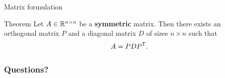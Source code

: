 \documentclass{beamer}
\begin{document}
\begin{frame}[t]{Matrix formulation}
	\grid
	
	\vspace{-0.3cm}
	\begin{block}{Theorem}
	Let $A \in \mathbb{R}^{n \times n}$ be a \textbf{symmetric} matrix. Then there exists an orthogonal matrix $P$ and a diagonal matrix $D$ of sizes $n \times n$ such that
	$$
		A = P D P^{{\sf T}}.
	$$
	\end{block}
\end{frame}


\appendix
\backupbegin
\begin{frame}[t]
	\frametitle{Questions?}
	\grid

	\pause
\end{frame}
\backupend
\end{document}
